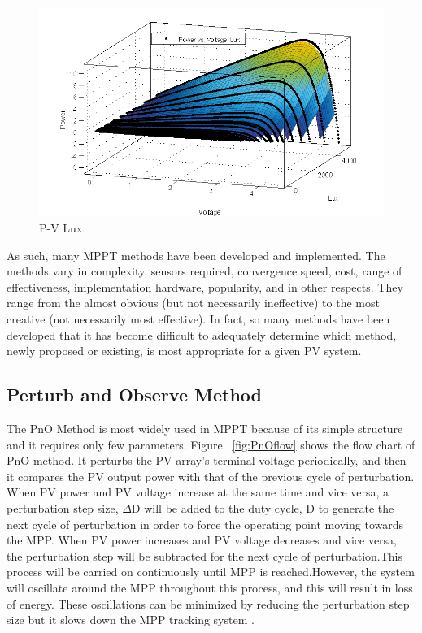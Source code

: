   \begin{figure}[H]
  \begin{center}
  \includegraphics[width=\textwidth]{images/PV_LUX}
  \caption{ P-V Lux}
  \label{fig:PVgraph}
  \end{center}
  \end{figure}

As such, many \ac{MPPT} methods have been developed and implemented. The methods vary in complexity, sensors required, convergence speed, cost, range of effectiveness, implementation hardware, popularity, and in other respects. They range from the almost obvious (but not necessarily ineffective) to the most creative (not necessarily most effective). In fact, so many methods have been developed that it has become difficult to adequately determine which method, newly proposed or existing, is most appropriate for a given PV system.\\

  \subsection{Perturb and Observe Method }
  The \ac{PnO} Method is most widely used in \ac{MPPT} because of  its simple structure and it requires only few parameters. Figure ~\ref{fig:PnOflow}  shows the flow chart of \ac{PnO} method. It perturbs the PV array's terminal voltage periodically, and then it compares the PV output power with that of the previous cycle of perturbation. When PV power and PV voltage increase at the same time and vice versa, a perturbation step size, ${\Delta}$D will be added to the duty cycle, D to generate the next cycle of   perturbation in order to force the operating point moving towards the \ac{MPP}. When PV power increases and PV voltage decreases and vice versa, the perturbation step will be subtracted for the next cycle of perturbation.This process will be carried on continuously until \ac{MPP} is reached.However, the system will oscillate around the \ac{MPP} throughout this process, and this will result in loss of energy. These oscillations can be minimized by reducing the perturbation step size but it slows down the \ac{MPP} tracking system \cite{ngan2011study}.  \\
  
